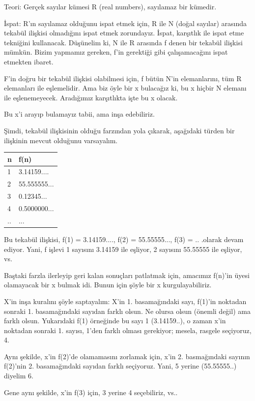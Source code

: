 \documentclass[12pt,fleqn]{article}\usepackage{../../common}
\begin{document}
Teori: Gerçek sayılar kümesi R (real numbers), sayılamaz bir kümedir.

İspat: R'ın sayılamaz olduğunu ispat etmek için, R ile N (doğal sayılar)
arasında tekabül ilişkisi olmadığını ispat etmek zorundayız. İspat,
karşıtlık ile ispat etme tekniğini kullanacak. Düşünelim ki, N ile R
arasında f denen bir tekabül ilişkisi mümkün. Bizim yapmamız gereken, f'in
gerektiği gibi çalışamacağını ispat etmekten ibaret.

F'in doğru bir tekabül ilişkisi olabilmesi için, f bütün N'in elemanlarını,
tüm R elemanları ile eşlemelidir. Ama biz öyle bir x bulacağız ki, bu x
hiçbir N elemanı ile eşlenemeyecek. Aradığımız karşıtlıkta işte bu x
olacak.

Bu x'i arayıp bulamayız tabii, ama inşa edebiliriz.

Şimdi, tekabül ilişkisinin olduğu farzından yola çıkarak, aşağıdaki türden
bir ilişkinin mevcut olduğunu varsayalım.

\begin{tabular}{ll}
n & f(n) \\
\hline
1 &  3.14159....\\
\hline
2 &  55.555555...\\
\hline
3 &  0.12345...\\
\hline
4 &  0.5000000...\\
\hline
.. &  ...
\end{tabular}

Bu tekabül ilişkisi, f(1) = 3.14159...., f(2) = 55.55555..., f(3) =
.. .olarak devam ediyor. Yani, f işlevi 1 sayısını 3.14159 ile eşliyor, 2
sayısını 55.55555 ile eşliyor, vs.

Baştaki farzla ilerleyip geri kalan sonuçları patlatmak için, amacımız
f(n)'in üyesi olamayacak bir x bulmak idi. Bunun için şöyle bir x
kurgulayabiliriz.

X'in inşa kuralını şöyle saptayalım: X'in 1. basamağındaki sayı, f(1)'in
noktadan sonraki 1. basamağındaki sayıdan farklı olsun. Ne olursa olsun
(önemli değil) ama farklı olsun. Yukarıdaki f(1) örneğinde bu sayı 1
(3.14159..), o zaman x'in noktadan sonraki 1. sayısı, 1'den farklı olması
gerekiyor; mesela, rasgele seçiyoruz, 4.

Aynı şekilde, x'in f(2)'de olamamasını zorlamak için, x'in 2. basmağındaki
sayının f(2)'nin 2. basamağındaki sayıdan farklı seçiyoruz. Yani, 5 yerine
(55.55555..) diyelim 6.

Gene aynı şekilde, x'in f(3) için, 3 yerine 4 seçebiliriz, vs..
\end{document}
